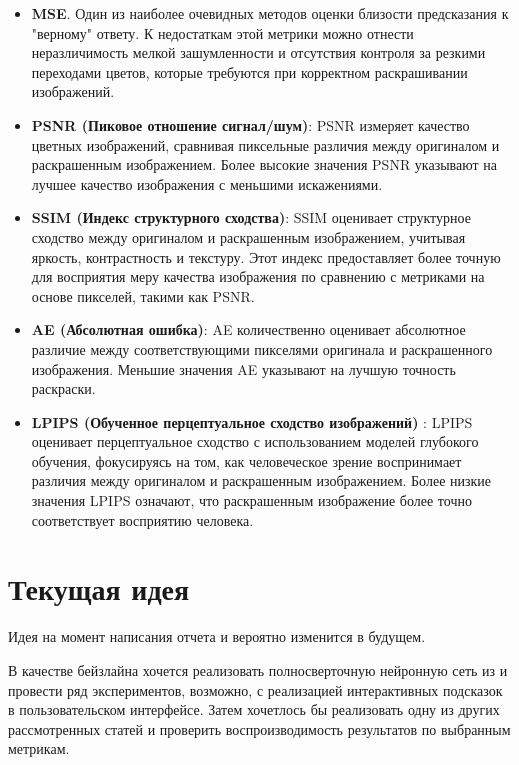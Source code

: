 \documentclass[14pt]{article}
\begin{document}
\begin{itemize}
    \item \textbf{MSE}. Один из наиболее очевидных методов оценки близости предсказания к "верному" ответу.
    К недостаткам этой метрики можно отнести неразличимость мелкой зашумленности и отсутствия контроля за резкими переходами цветов,
    которые требуются при корректном раскрашивании изображений.

    \item \textbf{PSNR (Пиковое отношение сигнал/шум)}: PSNR измеряет качество цветных изображений, сравнивая пиксельные различия между оригиналом и 
    раскрашенным изображением. Более высокие значения PSNR указывают на лучшее качество изображения с меньшими искажениями.

    \item \textbf{SSIM (Индекс структурного сходства)}: SSIM оценивает структурное сходство между оригиналом и раскрашенным изображением, 
    учитывая яркость, контрастность и текстуру. Этот индекс предоставляет более точную для восприятия меру качества изображения по сравнению 
    с метриками на основе пикселей, такими как PSNR.

    \item \textbf{AE (Абсолютная ошибка)}: AE количественно оценивает абсолютное различие между соответствующими пикселями оригинала и 
    раскрашенного изображения. Меньшие значения AE указывают на лучшую точность раскраски.

    \item \textbf{LPIPS (Обученное перцептуальное сходство изображений)} \cite{PerceptualMetric}: LPIPS оценивает перцептуальное сходство с использованием моделей 
    глубокого обучения, фокусируясь на том, как человеческое зрение воспринимает различия между оригиналом и раскрашенным изображением. 
    Более низкие значения LPIPS означают, что раскрашенным изображение более точно соответствует восприятию человека.
\end{itemize}


\section{Текущая идея}
Идея на момент написания отчета и вероятно изменится в будущем.

В качестве бейзлайна хочется реализовать полносверточную нейронную сеть из \cite{GuidedImageColorization} и провести ряд экспериментов, возможно,
с реализацией интерактивных подсказок в пользовательском интерфейсе. Затем хочетлось бы реализовать одну из других рассмотренных статей и проверить
воспроизводимость результатов по выбранным метрикам.



\printbibliography
\end{document}
